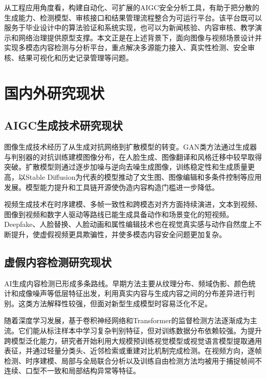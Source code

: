 从工程应用角度看，构建自动化、可扩展的AIGC安全分析工具，有助于把分散的生成能力、检测模型、审核接口和结果管理流程整合为可运行平台。该平台既可以服务于毕业设计中的算法验证和系统实现，也可以为新闻核验、内容审核、教学演示和网络治理提供原型支撑。本文正是在上述背景下，面向图像与视频场景设计并实现多模态内容检测与分析平台，重点解决多源能力接入、真实性检测、安全审核、结果可视化和历史记录管理等问题。

\section{国内外研究现状}

\subsection{AIGC生成技术研究现状}

图像生成技术经历了从生成对抗网络到扩散模型的转变。GAN类方法通过生成器与判别器的对抗训练建模图像分布，在人脸生成、图像翻译和风格迁移中较早取得突破\cite{ref1,ref2,ref3}。扩散模型则通过逐步加噪与逆向去噪生成图像，训练稳定性和生成质量更高，以Stable Diffusion为代表的模型推动了文生图、图像编辑和多条件控制等应用发展\cite{ref4,ref5,ref6,ref7,ref19}。模型能力提升和工具链开源使伪造内容构造门槛进一步降低。

视频生成技术在时序建模、多帧一致性和跨模态对齐方面持续演进，文本到视频、图像到视频和数字人驱动等路线已能生成具备动作和场景变化的短视频。Deepfake、人脸替换、人脸动画和属性编辑技术也在视觉真实感与动作自然度上不断提升，使虚假视频更具欺骗性，并使多模态内容安全问题更加复杂。

\subsection{虚假内容检测研究现状}

AI生成内容检测已形成多条路线。早期方法主要从纹理分布、频域伪影、颜色统计和成像噪声等低层特征出发，利用真实内容与生成内容之间的分布差异进行判别\cite{ref9,ref22}。这类方法解释性较强，但面对新型生成模型时容易泛化不足。

随着深度学习发展，基于卷积神经网络和Transformer的监督检测方法逐渐成为主流\cite{ref13,ref14}。它们能从标注样本中学习复杂判别特征，但对训练数据分布依赖较强。为提升跨模型泛化能力，研究者开始利用大规模预训练视觉模型或视觉语言模型提取通用表征，并通过轻量分类头、近邻检索或重建对比机制完成检测\cite{ref8,ref10,ref12}。在视频方向，逐帧检测、时序建模、局部与全局联合分析以及训练自由检测方法均被用于捕捉帧间不连续、口型不一致和局部结构异常等特征。

